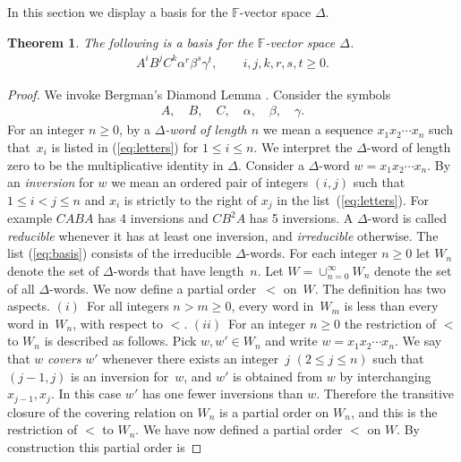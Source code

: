 \documentclass[pdftex]{sigma}
\numberwithin{equation}{section}
\newtheorem{Theorem}{Theorem}[section]
\begin{document}
 In this section we display a basis for the $\mathbb F$-vector
space $\Delta $.

\begin{Theorem}
\label{thm:basis}
The following is a basis for the $\mathbb F$-vector
space $ \Delta $.
\begin{gather}
\label{eq:basis}
A^iB^jC^k \alpha^r\beta^s\gamma^t, \qquad   i,j,k,r,s,t \geq 0.
\end{gather}
\end{Theorem}

\begin{proof}
We invoke  Bergman's Diamond Lemma
\cite[Theorem~1.2]{berg}.
Consider the symbols
\begin{gather}
\label{eq:letters}
A, \quad B, \quad C, \quad \alpha,\quad \beta, \quad \gamma.
\end{gather}
For an integer $n \geq 0$, by a {\it $\Delta $-word of length $n$}
we mean a sequence
 $x_1x_2\cdots x_n$ such that~$x_i$ is listed in
(\ref{eq:letters}) for $1 \leq i \leq n$.
We interpret the
$\Delta $-word
of length zero to be the multiplicative
identity in $\Delta $.
Consider a
 $\Delta $-word
$w=x_1x_2\cdots x_n$.
By an {\it inversion} for $w$
we mean an ordered pair of integers $(i,j)$
such that
$1\leq i<j\leq n$ and
$x_i$ is strictly to the right of
$x_j$ in the list~(\ref{eq:letters}).
For example $CABA$ has 4 inversions
and
$CB^2A$ has 5 inversions.
A $\Delta $-word is called {\it reducible} whenever it has at least one
inversion, and {\it irreducible} otherwise.
The list
(\ref{eq:basis}) consists of the irreducible $\Delta $-words.
For each integer $n\geq 0$ let
$W_n$ denote the set of $\Delta $-words that have
length~$n$.
Let $W=\cup_{n=0}^\infty W_n$ denote the
set of all
$\Delta $-words.
We now def\/ine a partial
order~$<$ on~$W$.
The def\/inition has two aspects.
$(i)$~For all integers  $n> m\geq 0$,
every word in~$W_m$ is less than
every word in~$W_n$, with respect to $<$.
$(ii)$~For an integer $n\geq 0$
the restriction of $<$ to $W_n$ is
described as follows.
Pick $w, w' \in
 W_n$ and write
 $w=x_1x_2\cdots x_n$.
We say that $w$ {\it covers} $w'$ whenever
there exists an integer~$j$ $(2 \leq j \leq n)$
such that $(j-1,j)$ is an inversion for~$w$,
and
$w'$ is obtained from $w$ by interchanging
$x_{j-1},x_j$.
In this case
$w'$ has one fewer inversions than $w$.
Therefore the transitive closure of the covering
relation on $W_n$ is a partial order on $W_n$, and this is
the restriction of
 $<$ to $W_n$.
We have now def\/ined a partial order $<$ on $W$.
By construction this partial order is

\end{proof}
\end{document}
